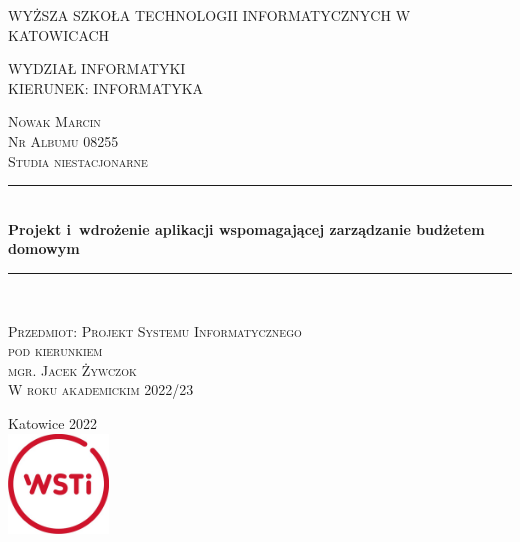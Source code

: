 \documentclass[a4paper,10pt]{report}
\newcommand{\customstyletitle}[1]{\Huge{\textbf{#1}}}
\newcommand{\HRule}{\rule{\linewidth}{0.5mm}} %
\begin{document}
\begin{titlepage}
	\begin{center}
    \begin{onehalfspace}
    \textsc{\LARGE{WYŻSZA SZKOŁA TECHNOLOGII INFORMATYCZNYCH W KATOWICACH}}\\
    \end{onehalfspace}
    \textsc{\large{WYDZIAŁ INFORMATYKI}}\\
	\textsc{\large{KIERUNEK: INFORMATYKA}}\\
    \end{center}
    
	\begin{flushleft}
    \textsc{Nowak Marcin}\\[0cm]
    \textsc{Nr Albumu 08255}\\[0cm]
    \textsc{Studia niestacjonarne}\\[0cm]
    \end{flushleft}
	
	\begin{center}
    \HRule\\[0.4cm]
	{\customstyletitle{Projekt i wdrożenie aplikacji wspomagającej zarządzanie budżetem domowym}}\\[0.4cm] 
    \HRule\\[1.5cm]
    \end{center}
	
	\begin{flushright}
        \textsc{Przedmiot: Projekt Systemu Informatycznego}\\[0cm]
        \textsc{pod kierunkiem}\\[0cm]
        \textsc{mgr. Jacek Żywczok}\\[0cm]
        \textsc{W roku akademickim 2022/23}\\[0cm]
    \end{flushright}
 
	\vfill                  %
	\begin{center}
    {Katowice 2022}\\	    %
	\includegraphics[width=0.2\textwidth]{figures/WSTI-logo.jpg}\\[1cm]
	\end{center}
\end{titlepage}
\end{document}
